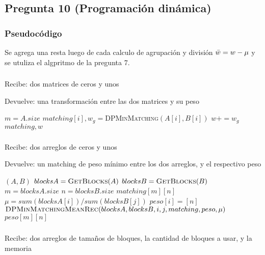 \subsection*{Pregunta 10 (Programación dinámica)}
\subsubsection*{Pseudocódigo}
Se agrega una resta luego de cada calculo de agrupación y división $
\Bar{w}=w-\mu$ y se utuliza el algpritmo de la pregunta 7.

\subsubsection*{}
Recibe: dos matrices de ceros y unos

Devuelve: una transformación entre las dos matrices y su peso
\begin{algorithmic}[1]
  \STATE $m=A.size$
    \STATE $matching[i],w_g=${\textsc{DPMinMatching}$(A[i], B[i])$}
    \STATE $w+=w_g$
  \ENDFOR
  \RETURN $matching,w$
   
\end{algorithmic}
\subsubsection*{}

Recibe: dos arreglos de ceros y unos

Devuelve: un matching de peso mínimo entre los dos arreglos, y el respectivo peso
\begin{algorithmic}[1]
  $(A,B)$
  \STATE $blocksA = \textsc{GetBlocks$(A)$}$
  \STATE $blocksB = \textsc{GetBlocks$(B)$}$
  \STATE $m = blocksA.size$
  \STATE $n = blocksB.size$
  \STATE $matching[m][n]$
  \STATE $\mu = sum(blocksA[i])/sum(blocksB[j])$
    \STATE $peso[i]=[n]$
        \STATE $\textsc{DPMinMatchingMeanRec$(blocksA,blocksB,i,j,matching,peso,\mu)$}$
    \ENDFOR
  \ENDFOR
  \RETURN $peso[m][n]$
\end{algorithmic}
\subsubsection*{}
Recibe: dos arreglos de tamaños de bloques, la cantidad de bloques a usar, y la memoria

